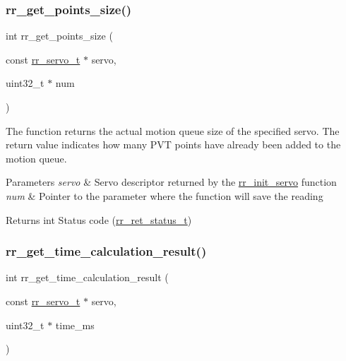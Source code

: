 \subsubsection{\texorpdfstring{rr\+\_\+get\+\_\+points\+\_\+size()}{rr\_get\_points\_size()}}
{\footnotesize\ttfamily int rr\+\_\+get\+\_\+points\+\_\+size (\begin{DoxyParamCaption}\item[{const \hyperlink{structrr__servo__t}{rr\+\_\+servo\+\_\+t} $\ast$}]{servo,  }\item[{uint32\+\_\+t $\ast$}]{num }\end{DoxyParamCaption})}



The function returns the actual motion queue size of the specified servo. The return value indicates how many P\+VT points have already been added to the motion queue. 


\begin{DoxyParams}{Parameters}
{\em servo} & Servo descriptor returned by the \hyperlink{group___common_ga0adb313a3eeb8a4399431e940a1f3e9e}{rr\+\_\+init\+\_\+servo} function \\
\hline
{\em num} & Pointer to the parameter where the function will save the reading \\
\hline
\end{DoxyParams}
\begin{DoxyReturn}{Returns}
int Status code (\hyperlink{api_8h_a92d5be5038abcf89837faf85a08debdc}{rr\+\_\+ret\+\_\+status\+\_\+t}) 
\end{DoxyReturn}
\mbox{\label{group___servo__info_ga0d01b53187b97dacd7611dacb37024d8}} 
\subsubsection{\texorpdfstring{rr\+\_\+get\+\_\+time\+\_\+calculation\+\_\+result()}{rr\_get\_time\_calculation\_result()}}
{\footnotesize\ttfamily int rr\+\_\+get\+\_\+time\+\_\+calculation\+\_\+result (\begin{DoxyParamCaption}\item[{const \hyperlink{structrr__servo__t}{rr\+\_\+servo\+\_\+t} $\ast$}]{servo,  }\item[{uint32\+\_\+t $\ast$}]{time\+\_\+ms }\end{DoxyParamCaption})}



